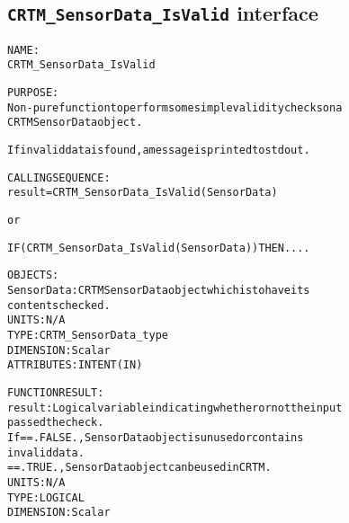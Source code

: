 \subsection{\texttt{CRTM\_SensorData\_IsValid} interface}
  \label{sec:CRTM_SensorData_IsValid_interface}
  \begin{alltt}
 
  NAME:
        CRTM_SensorData_IsValid
 
  PURPOSE:
        Non-pure function to perform some simple validity checks on a
        CRTM SensorData object.
 
        If invalid data is found, a message is printed to stdout.
 
  CALLING SEQUENCE:
        result = CRTM_SensorData_IsValid( SensorData )
 
          or
 
        IF ( CRTM_SensorData_IsValid( SensorData ) ) THEN....
 
  OBJECTS:
        SensorData:    CRTM SensorData object which is to have its
                       contents checked.
                       UNITS:      N/A
                       TYPE:       CRTM_SensorData_type
                       DIMENSION:  Scalar
                       ATTRIBUTES: INTENT(IN)
 
  FUNCTION RESULT:
        result:        Logical variable indicating whether or not the input
                       passed the check.
                       If == .FALSE., SensorData object is unused or contains
                                      invalid data.
                          == .TRUE.,  SensorData object can be used in CRTM.
                       UNITS:      N/A
                       TYPE:       LOGICAL
                       DIMENSION:  Scalar
 
  \end{alltt}
